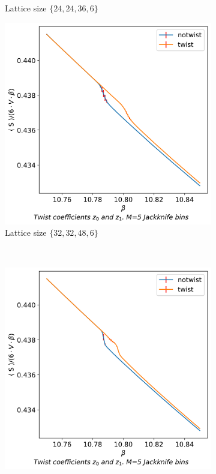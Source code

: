 \documentclass[english,twoside,openright]{UH_TCM_MSc}
\begin{document}
\begin{figure}[!htb]
\begin{subfigure}[t]{0.5\textwidth}
        \caption{Lattice size $\{24,24,36,6\}$}
    \end{subfigure}\vspace{1.5cm}
    \begin{subfigure}[t]{0.5\textwidth}
        \centering
        \includegraphics[width=\textwidth]{final_plots/action_volume_comparison/action_32_32_48.pdf}
        \caption{Lattice size $\{32,32,48,6\}$}
    \end{subfigure}%
    ~ 
    \begin{subfigure}[t]{0.5\textwidth}
        \centering
        \includegraphics[width=\textwidth]{final_plots/action_volume_comparison/action_44_44_64.pdf}

\end{subfigure}
\end{figure}
\end{document}
